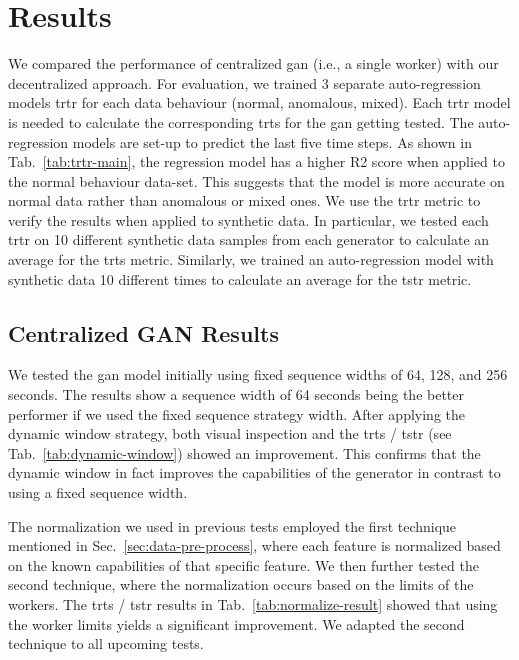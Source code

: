 \section{Results}


We compared the performance of centralized \gls*{gan} (i.e., a single worker) with our decentralized approach. 
For evaluation, we trained 3 separate auto-regression models \gls*{trtr} for each data behaviour (normal, anomalous, mixed). Each \gls*{trtr} model is needed to calculate the corresponding \gls*{trts} for the \gls*{gan} getting tested. The auto-regression models are set-up to predict the last five time steps.
%
As shown in Tab.~\ref{tab:trtr-main}, the regression model has a higher R2 score when applied to the normal behaviour data-set. This suggests that the model is more accurate on normal data rather than anomalous or mixed ones. We use the \gls*{trtr} metric to verify the results when applied to synthetic data. In particular, we tested each \gls*{trtr} on 10 different synthetic data samples from each generator to calculate an average for the \gls*{trts} metric. Similarly, we trained an auto-regression model with synthetic data 10 different times to calculate an average for the \gls*{tstr} metric.




\subsection{Centralized GAN Results}

We tested the \gls*{gan} model initially using fixed sequence widths of 64, 128, and 256 seconds. The results show a sequence width of 64 seconds being the better performer if we used the fixed sequence strategy width. After applying the dynamic window strategy, both visual inspection and the \gls*{trts} / \gls*{tstr} (see Tab.~\ref{tab:dynamic-window}) showed an improvement. This confirms that the dynamic window in fact improves the capabilities of the generator in contrast to using a fixed sequence width.


%
The normalization we used in previous tests employed the first technique mentioned in Sec.~\ref{sec:data-pre-process}, where each feature is normalized based on the known capabilities of that specific feature. We then further tested the second technique, where the normalization occurs based on the limits of the workers. The \gls*{trts} / \gls*{tstr} results in Tab.~\ref{tab:normalize-result} showed that using the worker limits yields a significant improvement. We adapted the second technique to all upcoming tests.



